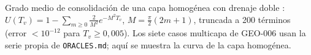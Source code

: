 Grado medio de consolidación de una capa homogénea con drenaje doble \cite{terzaghi}: $U(T_v)=1-\sum_{m\ge0}\frac{2}{M^2}e^{-M^2T_v}$, $M=\tfrac{\pi}{2}(2m+1)$, truncada a 200 términos (error $<10^{-12}$ para $T_v\ge0{,}005$). Los siete casos multicapa de GEO-006 usan la serie propia de \texttt{ORACLES.md}; aquí se muestra la curva de la capa homogénea.
